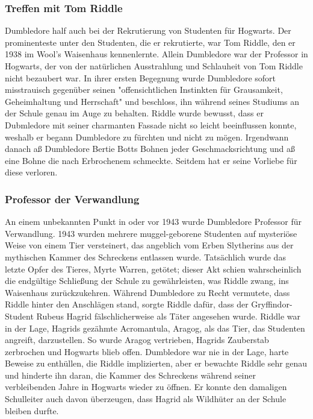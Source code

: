 \documentclass[a4paper, 10pt]{article}
\begin{document}
\subsubsection*{Treffen mit Tom Riddle}
Dumbledore half auch bei der Rekrutierung von Studenten für Hogwarts. Der prominenteste unter den Studenten, die er rekrutierte, war Tom Riddle, den er 1938 im Wool's Waisenhaus kennenlernte. Allein Dumbledore war der Professor in Hogwarts, der von der natürlichen Ausstrahlung und Schlauheit von Tom Riddle nicht bezaubert war. In ihrer ersten Begegnung wurde Dumbledore sofort misstrauisch gegenüber seinen "offensichtlichen Instinkten für Grausamkeit, Geheimhaltung und Herrschaft" und beschloss, ihn während seines Studiums an der Schule genau im Auge zu behalten. Riddle wurde bewusst, dass er Dubmledore mit seiner charmanten Fassade nicht so leicht beeinflussen konnte, weshalb er begann Dumbledore zu fürchten und nicht zu mögen.
\vspace{10pt}
\newline
{}  
Irgendwann danach aß Dumbledore Bertie Botts Bohnen jeder Geschmacksrichtung und aß eine Bohne die nach Erbrochenem schmeckte. Seitdem hat er seine Vorliebe für diese verloren.
\subsubsection*{Professor der Verwandlung}
An einem unbekannten Punkt in oder vor 1943 wurde Dumbledore Professor für Verwandlung.
\vspace{10pt}
\newline
{}  
1943 wurden mehrere muggel-geborene Studenten auf mysteriöse Weise von einem Tier versteinert, das angeblich vom Erben
Slytherins aus der mythischen Kammer des Schreckens entlassen wurde. Tatsächlich wurde das letzte Opfer des Tieres, Myrte Warren, getötet; dieser Akt schien wahrscheinlich die endgültige Schließung der Schule zu gewährleisten, was Riddle zwang, ins Waisenhaus zurückzukehren. Während Dumbledore zu Recht vermutete, dass Riddle hinter den Anschlägen stand, sorgte Riddle dafür, dass der Gryffindor-Student Rubeus Hagrid fälschlicherweise als Täter angesehen wurde.
\vspace{10pt}
\newline
{}  
Riddle war in der Lage, Hagrids gezähmte Acromantula, Aragog, als das Tier, das Studenten angreift, darzustellen. So wurde Aragog vertrieben, Hagrids Zauberstab zerbrochen und Hogwarts blieb offen. Dumbledore war nie in der Lage, harte Beweise zu enthüllen, die Riddle implizierten, aber er bewachte Riddle sehr genau und hinderte ihn daran, die Kammer des Schreckens während seiner verbleibenden Jahre in Hogwarts wieder zu öffnen. Er konnte den damaligen Schulleiter auch davon überzeugen, dass Hagrid als Wildhüter an der Schule bleiben durfte.
\end{document}
